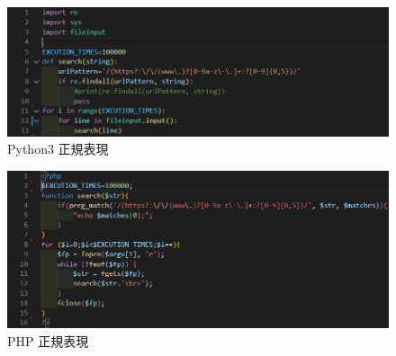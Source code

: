 \begin{figure}[tb]
    \centering
        \includegraphics[width=13.5cm,keepaspectratio]{figure/s-py.PNG}
        \caption{Python3 正規表現}
        \label{fig:s-py}
\end{figure}

\begin{figure}[tb]
    \centering
        \includegraphics[width=13.5cm,keepaspectratio]{figure/s-php.PNG}
        \caption{PHP 正規表現}
        \label{fig:s-php}
\end{figure}